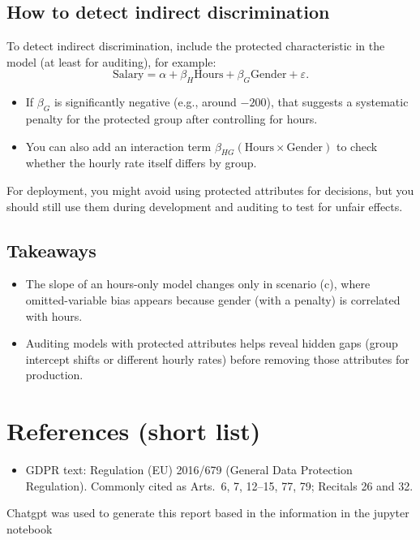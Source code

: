 \documentclass[12pt]{article}
\begin{document}
\subsection{How to detect indirect discrimination}
To detect indirect discrimination, include the protected characteristic in the model (at least for auditing), for example:
\begin{equation*}
\text{Salary} = \alpha + \beta_H \text{Hours} + \beta_G \text{Gender} + \varepsilon.
\end{equation*}
\begin{itemize}
  \item If $\beta_G$ is significantly negative (e.g., around $-200$), that suggests a systematic penalty for the protected group after controlling for hours.
  \item You can also add an interaction term $\beta_{HG}(\text{Hours}\times\text{Gender})$ to check whether the hourly rate itself differs by group.
\end{itemize}
For deployment, you might avoid using protected attributes for decisions, but you should still use them during development and auditing to test for unfair effects.

\subsection{Takeaways}
\begin{itemize}
  \item The slope of an hours-only model changes only in scenario (c), where omitted-variable bias appears because gender (with a penalty) is correlated with hours.
  \item Auditing models with protected attributes helps reveal hidden gaps (group intercept shifts or different hourly rates) before removing those attributes for production.
\end{itemize}

\section*{References (short list)}
\begin{itemize}
  \item GDPR text: Regulation (EU) 2016/679 (General Data Protection Regulation). Commonly cited as Arts.~6, 7, 12--15, 77, 79; Recitals 26 and 32.
\end{itemize}


Chatgpt was used to generate this report based in the information in the jupyter notebook
\end{document}
